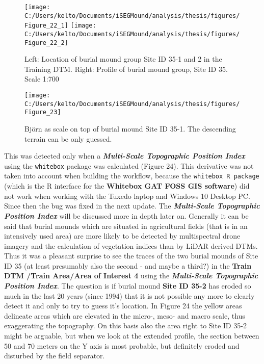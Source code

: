 \documentclass[
  12pt,
]{article}
\begin{document}
\begin{figure}
\texttt{[image: C:/Users/kelto/Documents/iSEGMound/analysis/thesis/figures/Figure\_22\_1]} \texttt{[image: C:/Users/kelto/Documents/iSEGMound/analysis/thesis/figures/Figure\_22\_2]} \caption{Left: Location of burial mound group Site ID 35-1 and 2 in the Training DTM. Right: Profile of burial mound group, Site ID 35. Scale 1:700}\label{fig:Figure22}
\end{figure}
\begin{figure}

{\centering \texttt{[image: C:/Users/kelto/Documents/iSEGMound/analysis/thesis/figures/Figure\_23]} 

}

\caption{Björn as scale on top of burial mound Site ID 35-1. The descending terrain can be only guessed.}\label{fig:Figure23}
\end{figure}

This was detected only when a \textbf{\emph{Multi-Scale Topographic Position Index}} using the \texttt{whitebox} package was calculated (Figure 24). This derivative was not taken into account when building the workflow, because the \texttt{whitebox\ R\ package} (which is the R interface for the \textbf{Whitebox GAT FOSS GIS software}) did not work when working with the Tuxedo laptop and Windows 10 Desktop PC. Since then the bug was fixed in the next update. The \textbf{\emph{Multi-Scale Topographic Position Index}} will be discussed more in depth later on.
Generally it can be said that burial mounds which are situated in agricultural fields (that is in an intensively used area) are more likely to be detected by multispectral drone imagery and the calculation of vegetation indices than by LiDAR derived DTMs. Thus it was a pleasant surprise to see the traces of the two burial mounds of Site ID 35 (at least presumably also the second - and maybe a third?) in the \textbf{Train DTM /Train Area/Area of Interest 4} using the \textbf{\emph{Multi-Scale Topographic Position Index}}. The question is if burial mound \textbf{Site ID 35-2} has eroded so much in the last 20 years (since 1994) that it is not possible any more to clearly detect it and only to try to guess it's location. In Figure 24 the yellow areas delineate areas which are elevated in the micro-, meso- and macro scale, thus exaggerating the topography. On this basis also the area right to Site ID 35-2 might be arguable, but when we look at the extended profile, the section between 50 and 70 meters on the Y axis is most probable, but definitely eroded and disturbed by the field separator.
\end{document}
